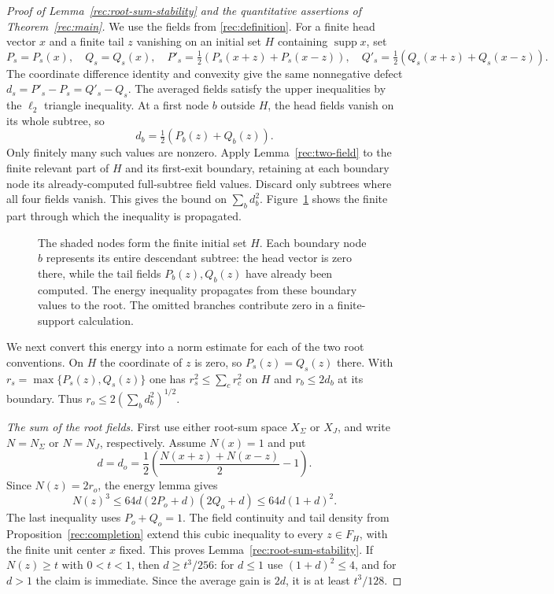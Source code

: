 \begin{proof}[Proof of Lemma~\ref{rec:root-sum-stability} and the quantitative assertions of Theorem~\ref{rec:main}]
We use the fields from \eqref{rec:definition}. For a finite head vector $x$ and a finite tail $z$
vanishing on an initial set $H$ containing $\operatorname{supp}x$, set
\[
 P_s=P_s(x),\quad Q_s=Q_s(x),\quad
 P'_s=\tfrac12(P_s(x+z)+P_s(x-z)),\quad
 Q'_s=\tfrac12(Q_s(x+z)+Q_s(x-z)).
\]
The coordinate difference identity and convexity give the same
nonnegative defect $d_s=P'_s-P_s=Q'_s-Q_s$. The averaged fields satisfy
the upper inequalities by the $\ell_2$ triangle inequality. At a first
node $b$ outside $H$, the head fields vanish on its whole subtree, so
\[
 d_b=\tfrac12(P_b(z)+Q_b(z)).
\]
Only finitely many such values are nonzero. Apply
Lemma~\ref{rec:two-field} to the finite relevant part of $H$ and its
first-exit boundary, retaining at each boundary node its already-computed
full-subtree field values. Discard only subtrees where all four fields
vanish. This gives the bound on $\sum_b d_b^2$. Figure~\ref{fig:boundary}
shows the finite part through which the inequality is propagated.
\begin{figure}[tb]
\centering

\caption{The shaded nodes form the finite initial set $H$. Each boundary
node $b$ represents its entire descendant subtree: the head vector is zero
there, while the tail fields $P_b(z),Q_b(z)$ have already been computed.
The energy inequality propagates from these boundary values to the root.
The omitted branches contribute zero in a finite-support calculation.}
\label{fig:boundary}
\end{figure}

We next convert this energy into a norm estimate for each of the two
root conventions.
On $H$ the coordinate of $z$ is zero, so $P_s(z)=Q_s(z)$ there. With
$r_s=\max\{P_s(z),Q_s(z)\}$ one has
$r_s^2\le\sum_c r_c^2$ on $H$ and $r_b\le2d_b$ at its boundary.
Thus $r_o\le2(\sum_b d_b^2)^{1/2}$.

\emph{The sum of the root fields.} First use either root-sum space $X_\Sigma$ or $X_J$, and write
$N=N_\Sigma$ or $N=N_J$, respectively. Assume $N(x)=1$ and put
\[
 d=d_o=\frac12\left(\frac{N(x+z)+N(x-z)}2-1\right).
\]
Since $N(z)=2r_o$, the energy lemma gives
\[
 N(z)^3\le64d(2P_o+d)(2Q_o+d)\le64d(1+d)^2.
\]
The last inequality uses $P_o+Q_o=1$. The field continuity and tail
density from Proposition~\ref{rec:completion} extend this cubic inequality to
every $z\in F_H$, with the finite unit center $x$ fixed. This proves
Lemma~\ref{rec:root-sum-stability}. If $N(z)\ge t$
with $0<t<1$, then $d\ge t^3/256$: for $d\le1$ use
$(1+d)^2\le4$, and for $d>1$ the claim is immediate. Since the average
gain is $2d$, it is at least $t^3/128$.


\end{proof}
